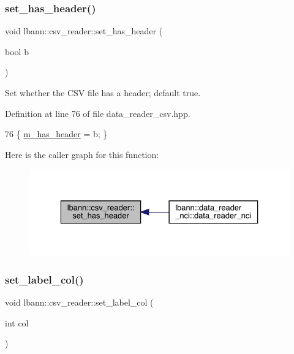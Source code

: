 \subsubsection{\texorpdfstring{set\+\_\+has\+\_\+header()}{set\_has\_header()}}
{\footnotesize\ttfamily void lbann\+::csv\+\_\+reader\+::set\+\_\+has\+\_\+header (\begin{DoxyParamCaption}\item[{bool}]{b }\end{DoxyParamCaption})\hspace{0.3cm}{\ttfamily [inline]}}



Set whether the C\+SV file has a header; default true. 



Definition at line 76 of file data\+\_\+reader\+\_\+csv.\+hpp.


\begin{DoxyCode}
76 \{ \hyperlink{classlbann_1_1csv__reader_a36d5e554882e8a32e1d111701af3bd90}{m\_has\_header} = b; \}
\end{DoxyCode}
Here is the caller graph for this function\+:\nopagebreak
\begin{figure}[H]
\begin{center}
\leavevmode
\includegraphics[width=329pt]{classlbann_1_1csv__reader_abc40f1b5848b1dcaf72cd1b84196c78e_icgraph}
\end{center}
\end{figure}
\mbox{\label{classlbann_1_1csv__reader_ad21bef8b7e1c1f9a03724475f987580c}} 
\subsubsection{\texorpdfstring{set\+\_\+label\+\_\+col()}{set\_label\_col()}}
{\footnotesize\ttfamily void lbann\+::csv\+\_\+reader\+::set\+\_\+label\+\_\+col (\begin{DoxyParamCaption}\item[{int}]{col }\end{DoxyParamCaption})\hspace{0.3cm}{\ttfamily [inline]}}



